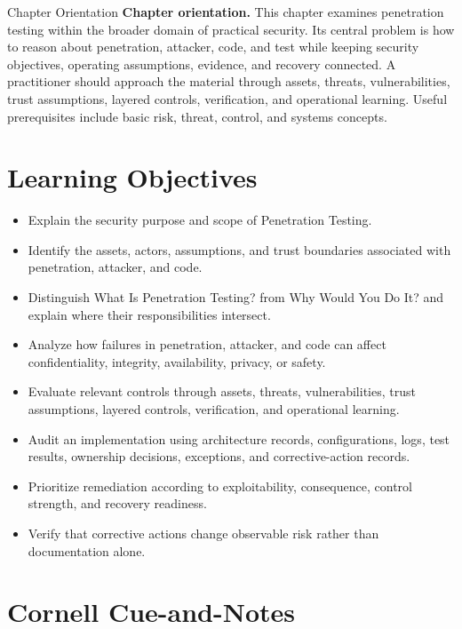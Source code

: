 \documentclass[11pt,letterpaper]{article}
\title{\CornellDocumentTitle}
\author{}
\date{}
\begin{document}
\maketitle
\begin{CornellOverviewBox}{Chapter Orientation}
\textbf{Chapter orientation.} This chapter examines penetration testing within the broader domain of practical security. Its central problem is how to reason about penetration, attacker, code, and test while keeping security objectives, operating assumptions, evidence, and recovery connected. A practitioner should approach the material through assets, threats, vulnerabilities, trust assumptions, layered controls, verification, and operational learning. Useful prerequisites include basic risk, threat, control, and systems concepts.
\end{CornellOverviewBox}
\section*{Learning Objectives}
\begin{itemize}
\item Explain the security purpose and scope of Penetration Testing.
\item Identify the assets, actors, assumptions, and trust boundaries associated with penetration, attacker, and code.
\item Distinguish What Is Penetration Testing? from Why Would You Do It? and explain where their responsibilities intersect.
\item Analyze how failures in penetration, attacker, and code can affect confidentiality, integrity, availability, privacy, or safety.
\item Evaluate relevant controls through assets, threats, vulnerabilities, trust assumptions, layered controls, verification, and operational learning.
\item Audit an implementation using architecture records, configurations, logs, test results, ownership decisions, exceptions, and corrective-action records.
\item Prioritize remediation according to exploitability, consequence, control strength, and recovery readiness.
\item Verify that corrective actions change observable risk rather than documentation alone.
\end{itemize}
\section*{Cornell Cue-and-Notes}
\end{document}
